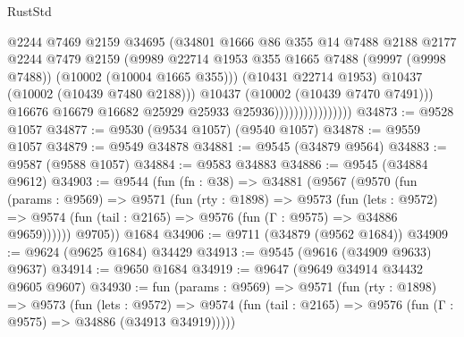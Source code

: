 \begin{lexlean}{RustStd}
\begin{coremodule}
                                      @2244
                                      @7469
                                      @2159
                                      @34695
                                      (@34801
                                        @1666
                                        @86
                                        @355
                                        @14
                                        @7488
                                        @2188
                                        @2177
                                        @2244
                                        @7479
                                        @2159
                                        (@9989
                                          @22714
                                          @1953
                                          @355
                                          @1665
                                          @7488
                                          (@9997 (@9998 @7488))
                                          (@10002 (@10004 @1665 @355)))
                                        (@10431 @22714 @1953)
                                        @10437
                                        (@10002 (@10439 @7480 @2188)))
                                      @10437
                                      (@10002 (@10439 @7470 @7491)))
                                    @16676
                                    @16679
                                    @16682
                                    @25929
                                    @25933
                                    @25936))))))))))))))))
@34873 := @9528 @1057
@34877 := @9530 (@9534 @1057) (@9540 @1057)
@34878 := @9559 @1057
@34879 := @9549 @34878
@34881 := @9545 (@34879 @9564)
@34883 := @9587 (@9588 @1057)
@34884 := @9583 @34883
@34886 := @9545 (@34884 @9612)
@34903 := @9544
    (fun (fn : @38) =>
    @34881
      (@9567
        (@9570
          (fun (params : @9569) =>
          @9571
            (fun (rty : @1898) =>
            @9573
              (fun (lets : @9572) =>
              @9574 (fun (tail : @2165) => @9576 (fun (Γ : @9575) => @34886 @9659))))))
        @9705))
    @1684
@34906 := @9711 (@34879 (@9562 @1684))
@34909 := @9624 (@9625 @1684) @34429
@34913 := @9545 (@9616 (@34909 @9633) @9637)
@34914 := @9650 @1684
@34919 := @9647 (@9649 @34914 @34432 @9605 @9607)
@34930 := fun (params : @9569) =>
  @9571
    (fun (rty : @1898) =>
    @9573
      (fun (lets : @9572) =>
      @9574 (fun (tail : @2165) => @9576 (fun (Γ : @9575) => @34886 (@34913 @34919)))))

\end{coremodule}
\end{lexlean}
